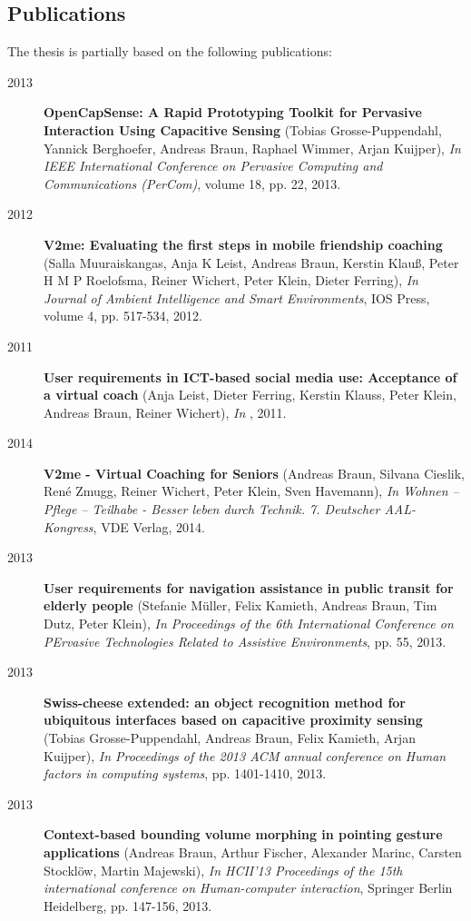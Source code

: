 \begin{appendix}


\chapter{Publications}
The thesis is partially based on the following publications:

\begin{description}
\item[2013]{\bf OpenCapSense: A Rapid Prototyping Toolkit for Pervasive Interaction Using Capacitive Sensing} (Tobias Grosse-Puppendahl, Yannick Berghoefer, Andreas Braun, Raphael Wimmer, Arjan Kuijper), {\em In IEEE International Conference on Pervasive Computing and Communications (PerCom)}, volume 18, pp. 22, 2013.
\item[2012]{\bf V2me: Evaluating the first steps in mobile friendship coaching} (Salla Muuraiskangas, Anja K Leist, Andreas Braun, Kerstin Klauß, Peter H M P Roelofsma, Reiner Wichert, Peter Klein, Dieter Ferring), {\em In Journal of Ambient Intelligence and Smart Environments}, IOS Press, volume 4, pp. 517-534, 2012.
\item[2011]{\bf User requirements in ICT-based social media use: Acceptance of a virtual coach} (Anja Leist, Dieter Ferring, Kerstin Klauss, Peter Klein, Andreas Braun, Reiner Wichert), {\em In }, 2011.
\item[2014]{\bf V2me - Virtual Coaching for Seniors} (Andreas Braun, Silvana Cieslik, René Zmugg, Reiner Wichert, Peter Klein, Sven Havemann), {\em In Wohnen – Pflege – Teilhabe - Besser leben durch Technik. 7. Deutscher AAL-Kongress}, VDE Verlag, 2014.
\item[2013]{\bf User requirements for navigation assistance in public transit for elderly people} (Stefanie Müller, Felix Kamieth, Andreas Braun, Tim Dutz, Peter Klein), {\em In Proceedings of the 6th International Conference on PErvasive Technologies Related to Assistive Environments}, pp. 55, 2013.
\item[2013] {\bf Swiss-cheese extended: an object recognition method for ubiquitous interfaces based on capacitive proximity sensing} (Tobias Grosse-Puppendahl, Andreas Braun, Felix Kamieth, Arjan Kuijper), {\em In Proceedings of the 2013 ACM annual conference on Human factors in computing systems}, pp. 1401-1410, 2013.
\item[2013]{\bf Context-based bounding volume morphing in pointing gesture applications} (Andreas Braun, Arthur Fischer, Alexander Marinc, Carsten Stocklöw, Martin Majewski), {\em In HCII'13 Proceedings of the 15th international conference on Human-computer interaction}, Springer Berlin Heidelberg, pp. 147-156, 2013.

\end{description}
\end{appendix}
